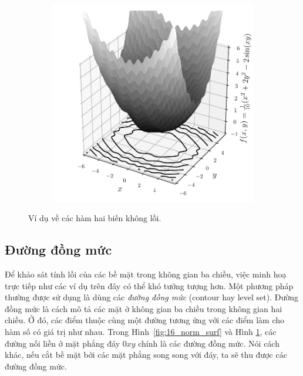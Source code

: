 \begin{figure}[t]
\begin{subfigure}{0.48\textwidth}
    \includegraphics[width=0.95\linewidth]{ebookML_src/src/convexity/nonconvex_surface.pdf}
    \end{subfigure}
    \caption{Ví dụ về các hàm hai biến không lồi. }
    \label{fig:16_nonconvexsurface}
\end{figure}

\subsection{Đường đồng mức} 
Để khảo sát tính lồi của các bề mặt trong không gian ba chiều, việc minh hoạ
trực tiếp như các ví dụ trên đây có thể khó tưởng tượng hơn. Một phương pháp
thường được sử dụng là dùng các \textit{đường đồng mức} ({contour} hay
{level set}). Đường đồng mức là cách mô tả các mặt ở không gian ba chiều
trong không gian hai chiều. Ở đó, các điểm thuộc cùng một {đường} tương
ứng với các điểm làm cho hàm số có giá trị như nhau. Trong Hình~\ref{fig:16_norm_surf} và Hình
\ref{fig:16_nonconvexsurface}, các đường nối liền ở mặt phẳng đáy $0xy$
chính là các đường đồng mức. Nói cách khác, nếu cắt bề mặt bởi các mặt phẳng song song với đáy, ta sẽ thu được các đường đồng mức.


